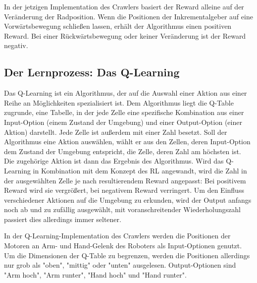 In der jetzigen Implementation des Crawlers basiert der Reward alleine auf der Veränderung der Radposition. Wenn die Positionen der Inkrementalgeber auf eine Vorwärtsbewegung schließen lassen, erhält der Algorithmus einen positiven Reward. Bei einer Rückwärtsbewegung oder keiner Veränderung ist der Reward negativ.

\subsection{Der Lernprozess: Das Q-Learning}

Das Q-Learning ist ein Algorithmus, der auf die Auswahl einer Aktion aus einer Reihe an Möglichkeiten spezialisiert ist. Dem Algorithmus liegt die Q-Table zugrunde, eine Tabelle, in der jede Zelle eine spezifische Kombination aus einer Input-Option (einem Zustand der Umgebung) und einer Output-Option (einer Aktion) darstellt. Jede Zelle ist außerdem mit einer Zahl besetzt. Soll der Algorithmus eine Aktion auswählen, wählt er aus den Zellen, deren Input-Option dem Zustand der Umgebung entspricht, die Zelle, deren Zahl am höchsten ist. Die zugehörige Aktion ist dann das Ergebnis des Algorithmus. Wird das Q-Learning in Kombination mit dem Konzept des RL angewandt, wird die Zahl in der ausgewählten Zelle je nach resultierendem Reward angepasst: Bei positivem Reward wird sie vergrößert, bei negativem Reward verringert. Um den Einfluss verschiedener Aktionen auf die Umgebung zu erkunden, wird der Output anfangs noch ab und zu zufällig ausgewählt, mit voranschreitender Wiederholungszahl passiert dies allerdings immer seltener.

In der Q-Learning-Implementation des Crawlers werden die Positionen der Motoren an Arm- und Hand-Gelenk des Roboters als Input-Optionen genutzt. Um die Dimensionen der Q-Table zu begrenzen, werden die Positionen allerdings nur grob als "oben", "mittig" oder "unten" ausgelesen. Output-Optionen sind "Arm hoch", "Arm runter", "Hand hoch" und "Hand runter".

